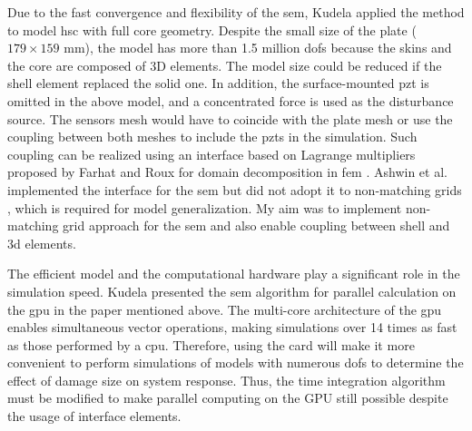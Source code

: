 Due to the fast convergence and flexibility of the \ac{sem}, Kudela applied the method to model \ac{hsc} with full core geometry.
Despite the small size of the plate ($179 \times 159$ mm), the model has more than 1.5 million \acp{dof} because the skins and the core are composed of 3D elements.
The model size could be reduced if the shell element replaced the solid one.
In addition, the surface-mounted \ac{pzt} is omitted in the above model, and a concentrated force is used as the disturbance source.
The sensors mesh would have to coincide with the plate mesh or use the coupling between both meshes to include the \acp{pzt} in the simulation.
Such coupling can be realized using an interface based on Lagrange multipliers proposed by Farhat and Roux for domain decomposition in \ac{fem} \cite{farhat1991method}.
Ashwin et al. implemented the interface for the \ac{sem} but did not adopt it to non-matching grids \cite{ashwin2014formulation}, which is required for model generalization.
My aim was to implement non-matching grid approach for the \ac{sem} and also enable coupling between shell and \ac{3d} elements.

The efficient model and the computational hardware play a significant role in the simulation speed. 
Kudela presented the \ac{sem} algorithm for parallel calculation on the \ac{gpu} in the paper mentioned above.
The multi-core architecture of the \ac{gpu} enables simultaneous vector operations, making simulations over 14 times as fast as those performed by a \ac{cpu}.
Therefore, using the card will make it more convenient to perform simulations of models with numerous \acp{dof} to determine the effect of damage size on system response.
Thus, the time integration algorithm must be modified to make parallel computing on the GPU still possible despite the usage of interface elements.
